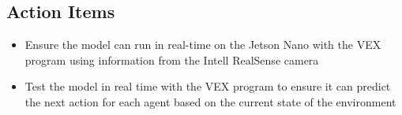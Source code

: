 \subsection{Action Items}
\begin{itemize}
    \item Ensure the model can run in real-time on the Jetson Nano with the VEX program using information from the Intell RealSense camera
    \item Test the model in real time with the VEX program to ensure it can predict the next action for each agent based on the current state of the environment
\end{itemize}